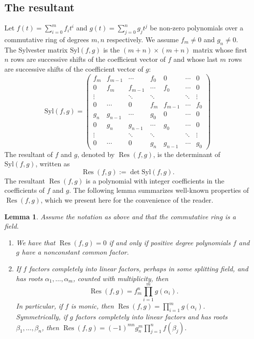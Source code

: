 \documentclass[11pt,reqno]{amsart}
\newtheorem{lemma}[theorem]{Lemma}
\theoremstyle{remark}
\DeclareMathOperator{\Res}{Res}
\begin{document}
\subsection{The resultant}
\label{subsec:sylvester}
Let $f(t)=\sum_{i=0}^m f_it^i$ and $g(t)=\sum_{j=0}^n g_jt^j$ be non-zero
polynomials over a commutative ring of degrees $m,n$ respectively.
We assume $f_{m} \neq 0$ and $g_{n} \neq 0$.
The Sylvester matrix $\mathrm{Syl}(f,g)$ is the
$(m+n)\times(m+n)$ matrix whose first $n$ rows are successive shifts of
the coefficient vector of $f$ and whose last $m$ rows are successive
shifts of the coefficient vector of $g$:
\begin{equation}\label{eq:sylvester_matrix}
\text{Syl}(f, g) =
\begin{pmatrix}
f_m    & f_{m-1} & \cdots & f_0    & 0       & \cdots & 0 \\
0      & f_m     & f_{m-1} & \cdots & f_0     & \cdots & 0 \\
\vdots &         & \ddots  & \ddots &         & \ddots & \vdots \\
0      & \cdots  & 0       & f_m    & f_{m-1} & \cdots & f_0 \\
g_n    & g_{n-1} & \cdots & g_0    & 0       & \cdots & 0 \\
0      & g_n     & g_{n-1} & \cdots & g_0     & \cdots & 0 \\
\vdots &         & \ddots  & \ddots &         & \ddots & \vdots \\
0      & \cdots  & 0       & g_n    & g_{n-1} & \cdots & g_0
\end{pmatrix}
\end{equation}
 The resultant of $f$ and $g$, denoted by $\Res(f,g)$, is the determinant of $\mathrm{Syl}(f,g)$, written as
$$
\Res(f,g) := \det\mathrm{Syl}(f,g).
$$
The resultant $\Res(f,g)$ is a polynomial with integer coefficients in the
coefficients of $f$ and $g$.  The following lemma summarizes well-known
properties of $\Res(f,g)$, which we present here for the convenience
of the reader.

\begin{lemma}
\label{prop:resultant-basic}
Assume the notation as above and that the commutative ring is a field.
\begin{enumerate}[label=(\roman*)]
\item We have that $\Res(f,g)=0$ if and only if
positive degree polynomials $f$ and $g$ have a nonconstant common
factor.
\item  If $f$ factors completely into linear factors, perhaps in some splitting field, and has roots
$\alpha_1,\dots,\alpha_m$, counted with multiplicity, then
\begin{equation}
\label{eq:product-formula}
\Res(f,g) = f_m^n\prod_{i=1}^m g(\alpha_i).
\end{equation}
In particular, if $f$ is monic, then $\Res(f,g)=\prod_{i=1}^m g(\alpha_i)$.
Symmetrically, if $g$ factors completely into linear factors and has roots $\beta_1,\dots,\beta_n$, then
$\Res(f,g)=(-1)^{mn}g_n^m\prod_{j=1}^n f(\beta_j)$.
\end{enumerate}
\end{lemma}
\end{document}
